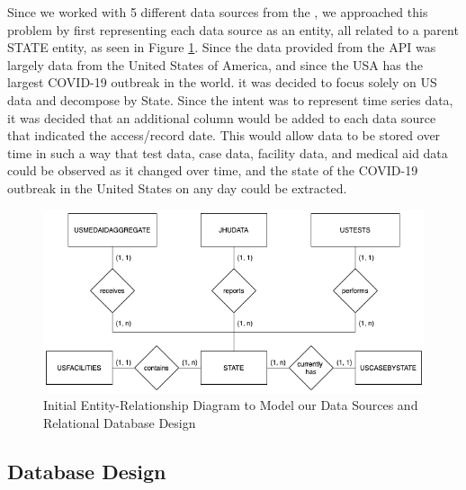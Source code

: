 \documentclass[11pt]{article}
\newcommand{\MYhref}[3][blue]{\href{#2}{\color{#1}{#3}}}%
\begin{document}
\noindent
Since we worked with 5 different data sources from the \MYhref{https://www.npmjs.com/package/covid19-api}{Covid-19 API}, we approached this problem by first representing each data source as an entity, all related to a parent STATE entity, as seen in Figure \ref{fig:er2}. Since the data provided from the API was largely data from the United States of America, and since the USA has the largest COVID-19 outbreak in the world. it was decided to focus solely on US data and decompose by State. Since the intent was to represent time series data, it was decided that an additional column would be added to each data source that indicated the access/record date. This would allow data to be stored over time in such a way that test data, case data, facility data, and medical aid data could be observed as it changed over time, and the state of the COVID-19 outbreak in the United States on any day could be extracted.

\vspace{3em}

\FloatBarrier
\begin{figure}[h]
    \centering
    \includegraphics[width=\textwidth]{diagrams/ER2.png}
    \caption{Initial Entity-Relationship Diagram to Model our Data Sources and Relational Database Design}
    \label{fig:er2}
\end{figure}
\FloatBarrier

\pagebreak

\subsection{Database Design}
\label{subsec:design}
\end{document}
